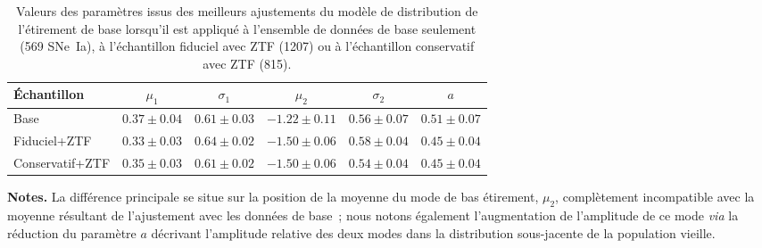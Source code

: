 \documentclass[../main/main.tex]{subfiles}
\begin{document}
\begin{table*}
    \centering
    \begin{threeparttable}
        \caption[Valeurs des paramètres du modèle d'étirement de base selon
        l'échantillon avec les données de ZTF]{Valeurs des paramètres issus des
            meilleurs ajustements du modèle de distribution de l'étirement de
            base lorsqu'il est appliqué à l'ensemble de données de base
            seulement (569 SNe~Ia), à l'échantillon fiduciel avec ZTF (1207) ou
        à l'échantillon conservatif avec ZTF (815).}
        \label{tab:modelresults_ztf}
        \begin{tabular}{lccccc}
            \toprule
            Échantillon      & $\mu_1$             & $\sigma_1$
                             & $\mu_2$             & $\sigma_2$
                             & $a$ \\
            \midrule
            Base             & $ 0.37 \pm 0.04$    & $0.61 \pm 0.03$
                             & $-1.22 \pm 0.11$    & $0.56 \pm 0.07$
                             & $ 0.51 \pm 0.07$ \\
            Fiduciel+ZTF     & $ 0.33 \pm 0.03$    & $0.64 \pm 0.02$
                             & $-1.50 \pm 0.06$    & $0.58 \pm 0.04$
                             & $ 0.45 \pm 0.04$ \\
            Conservatif+ZTF  & $ 0.35 \pm 0.03$    & $0.61 \pm 0.02$
                             & $-1.50 \pm 0.06$    & $0.54 \pm 0.04$
                             & $ 0.45 \pm 0.04$ \\
            \bottomrule
        \end{tabular}
        \begin{tablenotes}[flushleft]
            \item\small \textbf{\hspace{-3.2pt}Notes.} La différence principale se
                situe sur la position de la moyenne du mode de bas étirement,
                $\mu_2$, complètement incompatible avec la moyenne résultant de
                l'ajustement avec les données de base~; nous notons également
                l'augmentation de l'amplitude de ce mode \textit{via} la
                réduction du paramètre $a$ décrivant l'amplitude relative des
                deux modes dans la distribution sous-jacente de la population
                vieille.
        \end{tablenotes}
    \end{threeparttable}
\end{table*}
\end{document}
